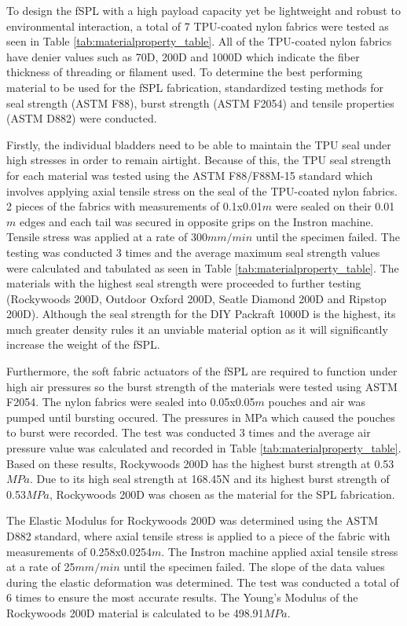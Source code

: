 \documentclass[letterpaper, 10 pt, conference]{ieeeconf}  %
\begin{document}
To design the fSPL with a high payload capacity yet be lightweight and robust to environmental interaction, a total of 7 TPU-coated nylon fabrics were tested as seen in Table \ref{tab:materialproperty_table}. All of the TPU-coated nylon fabrics have denier values such as 70D, 200D and 1000D which indicate the fiber thickness of threading or filament used. To determine the best performing material to be used for the fSPL fabrication, standardized testing methods for seal strength (ASTM F88), burst strength (ASTM F2054) and tensile properties (ASTM D882) were conducted.

Firstly, the individual bladders need to be able to maintain the TPU seal under high stresses in order to remain airtight. Because of this, the TPU seal strength for each material was tested using the ASTM F88/F88M-15 standard which involves applying axial tensile stress on the seal of the TPU-coated nylon fabrics. 2 pieces of the fabrics with measurements of 0.1x0.01$m$ were sealed on their 0.01$m$ edges and each tail was secured in opposite grips on the Instron machine. Tensile stress was applied at a rate of 300$mm/min$ until the specimen failed. The testing was conducted 3 times and the average maximum seal strength values were calculated and tabulated as seen in Table \ref{tab:materialproperty_table}. The materials with the highest seal strength were proceeded to further testing (Rockywoods 200D, Outdoor Oxford 200D, Seatle Diamond 200D and Ripstop 200D). Although the seal strength for the DIY Packraft 1000D is the highest, its much greater density rules it an unviable material option as it will significantly increase the weight of the fSPL.

Furthermore, the soft fabric actuators of the fSPL are required to function under high air pressures so the burst strength of the materials were tested using ASTM F2054. The nylon fabrics were sealed into 0.05x0.05$m$ pouches and air was pumped until bursting occured. The pressures in MPa which caused the pouches to burst were recorded. The test was conducted 3 times and the average air pressure value was calculated and recorded in Table \ref{tab:materialproperty_table}. Based on these results, Rockywoods 200D has the highest burst strength at 0.53$MPa$. Due to its high seal strength at 168.45N and its highest burst strength of 0.53$MPa$, Rockywoods 200D was chosen as the material for the SPL fabrication.

The Elastic Modulus for Rockywoods 200D was determined using the ASTM D882 standard, where axial tensile stress is applied to a piece of the fabric with measurements of 0.258x0.0254$m$. The Instron machine applied axial tensile stress at a rate of 25$mm/min$ until the specimen failed. The slope of the data values during the elastic deformation was determined. The test was conducted a total of 6 times to ensure the most accurate results. The Young’s Modulus of the Rockywoods 200D material is calculated to be 498.91$MPa$.
\end{document}

